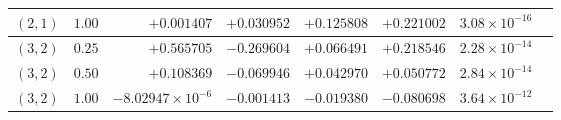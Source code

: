 \documentclass[aps,pra,onecolumn,notitlepage,11pt,tightenlines,amsmath,amssymb,floatfix,longbibliography]{revtex4-2}
\begin{document}
\begin{table}[t]
\begin{ruledtabular}
\begin{tabular}{ccrrrrrc}
$(2,1)$ & $1.00$ & $+0.001407$ & $+0.030952$ & $+0.125808$ & $+0.221002$ & $3.08\times 10^{-16}$ \\
\hline
$(3,2)$ & $0.25$ & $+0.565705$ & $-0.269604$ & $+0.066491$ & $+0.218546$ & $2.28\times 10^{-14}$ \\
$(3,2)$ & $0.50$ & $+0.108369$ & $-0.069946$ & $+0.042970$ & $+0.050772$ & $2.84\times 10^{-14}$ \\
$(3,2)$ & $1.00$ & $-8.02947\times 10^{-6}$ & $-0.001413$ & $-0.019380$ & $-0.080698$ & $3.64\times 10^{-12}$ \\
\end{tabular}
\end{ruledtabular}
\end{table}


\end{document}
